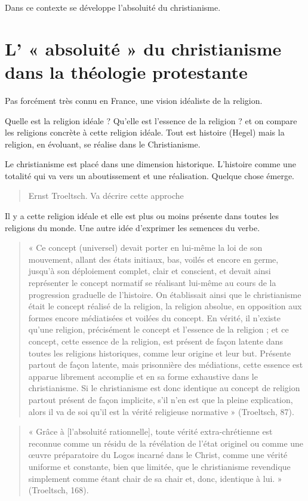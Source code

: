     Dans ce contexte se développe l'absoluité du christianisme.


  \section{L' « absoluité » du christianisme dans la théologie
  protestante} 
 
 Pas forcément très connu en France, une vision idéaliste de la religion.  
 \begin{Def}[absoluité]
  Quelle est la religion idéale ? Qu'elle est l'essence de la religion ? et on compare les religions concrète à cette religion idéale. Tout est histoire (Hegel) mais la religion, en évoluant, se réalise dans le Christianisme.
 \end{Def}
  Le christianisme est placé dans une dimension historique.
  L'histoire comme une totalité qui va vers un aboutissement et une réalisation. Quelque chose émerge. 
  \begin{quote}
      Ernst Troeltsch. Va décrire cette approche
  \end{quote}
  Il y a cette religion idéale et elle est plus ou moins présente dans toutes les religions du monde. Une autre idée d'exprimer les semences du verbe. 
  \begin{quote}
      «  Ce  concept  (universel)  devait  porter  en  lui-même  la  loi  de  son  mouvement,  allant  des  états  initiaux, bas,  voilés  et  encore  en  germe,  jusqu’à  son  déploiement  complet,  clair  et  conscient,  et  devait  ainsi représenter  le  concept  normatif  se  réalisant  lui-même  au  cours  de  la  progression  graduelle  de l’histoire.  On  établissait  ainsi  que  le  christianisme  était  le  concept  réalisé  de  la  religion,  la  religion absolue,  en  opposition  aux  formes  encore  médiatisées  et  voilées  du  concept.  En  vérité,  il  n’existe qu’une  religion,  précisément  le  concept  et  l’essence  de  la  religion  ;  et  ce  concept,  cette  essence  de  la religion,  est  présent  de  façon  latente  dans  toutes  les  religions  historiques,  comme  leur  origine  et  leur but.  Présente  partout  de  façon  latente,  mais  prisonnière  des  médiations,  cette  essence  est  apparue librement  accomplie  et  en  sa  forme  exhaustive  dans  le  christianisme.  Si  le  christianisme  est  donc identique  au  concept  de  religion  partout  présent  de  façon  implicite,  s’il  n’en  est  que  la  pleine explication,  alors  il  va  de  soi  qu’il  est  la  vérité  religieuse  normative  »  (Troeltsch,  87).
          \end{quote}
      \begin{quote}
      «  Grâce  à  [l’absoluité  rationnelle],  toute  vérité  extra-chrétienne  est  reconnue  comme  un  résidu  de  la révélation  de  l’état  originel  ou  comme  une  œuvre  préparatoire  du  Logos  incarné  dans  le  Christ,  comme une  vérité  uniforme  et  constante,  bien  que  limitée,  que  le  christianisme  revendique  simplement  comme étant  chair  de  sa  chair  et,  donc,  identique  à  lui.  »  (Troeltsch,  168). 
  \end{quote}
  
